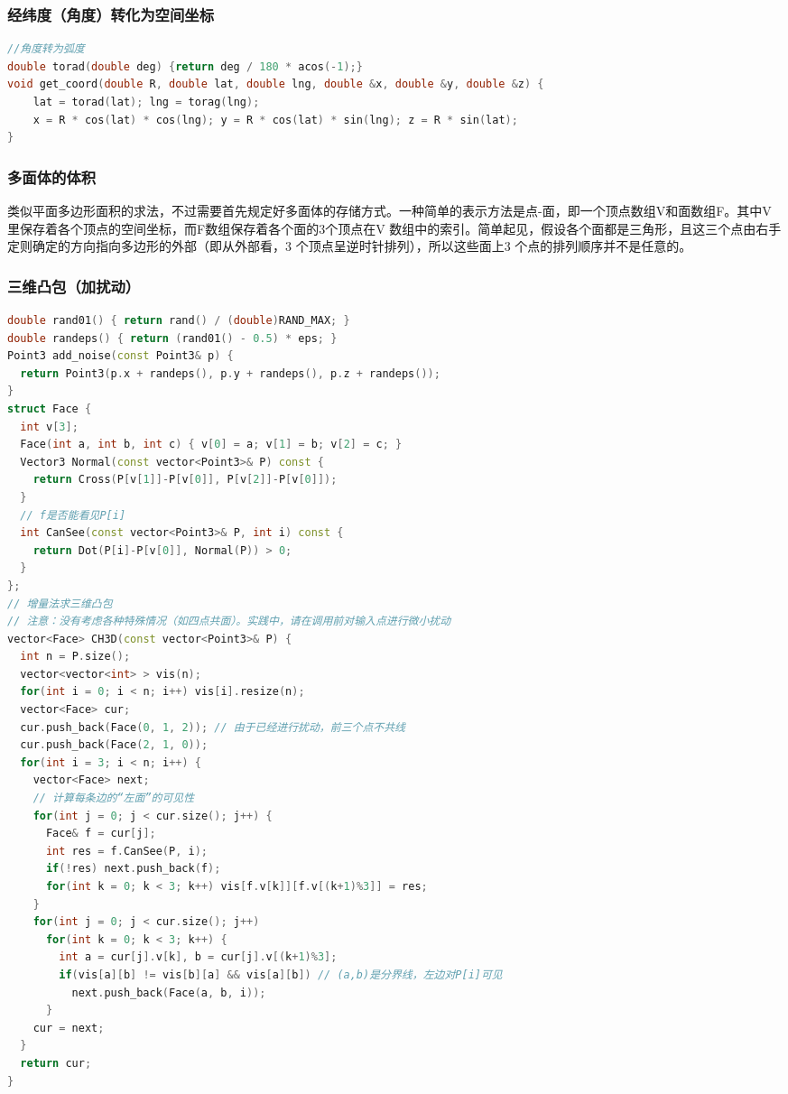 \documentclass[landscape,a4paper]{article}
\begin{document}
\begin{spacing}{0.3}
\begin{multicols}{2}
\subsubsection{经纬度（角度）转化为空间坐标}
\begin{lstlisting}[language=C++]
//角度转为弧度
double torad(double deg) {return deg / 180 * acos(-1);}
void get_coord(double R, double lat, double lng, double &x, double &y, double &z) {
    lat = torad(lat); lng = torag(lng);
    x = R * cos(lat) * cos(lng); y = R * cos(lat) * sin(lng); z = R * sin(lat);
}
\end{lstlisting}
\subsubsection{多面体的体积}
类似平面多边形面积的求法，不过需要首先规定好多面体的存储方式。一种简单的表示方法是点-面，即一个顶点数组V和面数组F。其中V里保存着各个顶点的空间坐标，而F数组保存着各个面的3个顶点在V 数组中的索引。简单起见，假设各个面都是三角形，且这三个点由右手定则确定的方向指向多边形的外部（即从外部看，3 个顶点呈逆时针排列），所以这些面上3 个点的排列顺序并不是任意的。
\subsubsection{三维凸包（加扰动）}
\begin{lstlisting}[language=C++]
double rand01() { return rand() / (double)RAND_MAX; }
double randeps() { return (rand01() - 0.5) * eps; }
Point3 add_noise(const Point3& p) {
  return Point3(p.x + randeps(), p.y + randeps(), p.z + randeps());
}
struct Face {
  int v[3];
  Face(int a, int b, int c) { v[0] = a; v[1] = b; v[2] = c; }
  Vector3 Normal(const vector<Point3>& P) const {
    return Cross(P[v[1]]-P[v[0]], P[v[2]]-P[v[0]]);
  }
  // f是否能看见P[i]
  int CanSee(const vector<Point3>& P, int i) const {
    return Dot(P[i]-P[v[0]], Normal(P)) > 0;
  }
};
// 增量法求三维凸包
// 注意：没有考虑各种特殊情况（如四点共面）。实践中，请在调用前对输入点进行微小扰动
vector<Face> CH3D(const vector<Point3>& P) {
  int n = P.size();
  vector<vector<int> > vis(n);
  for(int i = 0; i < n; i++) vis[i].resize(n);
  vector<Face> cur;
  cur.push_back(Face(0, 1, 2)); // 由于已经进行扰动，前三个点不共线
  cur.push_back(Face(2, 1, 0));
  for(int i = 3; i < n; i++) {
    vector<Face> next;
    // 计算每条边的“左面”的可见性
    for(int j = 0; j < cur.size(); j++) {
      Face& f = cur[j];
      int res = f.CanSee(P, i);
      if(!res) next.push_back(f);
      for(int k = 0; k < 3; k++) vis[f.v[k]][f.v[(k+1)%3]] = res;
    }
    for(int j = 0; j < cur.size(); j++)
      for(int k = 0; k < 3; k++) {
        int a = cur[j].v[k], b = cur[j].v[(k+1)%3];
        if(vis[a][b] != vis[b][a] && vis[a][b]) // (a,b)是分界线，左边对P[i]可见
          next.push_back(Face(a, b, i));
      }
    cur = next;
  }
  return cur;
}
\end{lstlisting}


\end{multicols}
\end{spacing}
\end{document}
